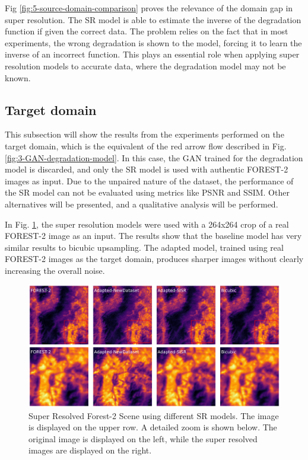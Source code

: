         Fig \ref{fig:5-source-domain-comparison} proves the relevance of the domain gap in super resolution. The SR model is able to estimate the inverse of the degradation function if given the correct data. The problem relies on the fact that in most experiments, the wrong degradation is shown to the model, forcing it to learn the inverse of an incorrect function.  
        This plays an essential role when applying super resolution models to accurate data, where the degradation model may not be known. 

    \subsection{Target domain}

        This subsection will show the results from the experiments performed on the target domain, which is the equivalent of the red arrow flow described in Fig. \ref{fig:3-GAN-degradation-model}.
        In this case, the GAN trained for the degradation model is discarded, and only the SR model is used with authentic FOREST-2 images as input.
        Due to the unpaired nature of the dataset, the performance of the SR model can not be evaluated using metrics like PSNR and SSIM. 
        Other alternatives will be presented, and a qualitative analysis will be performed. 
        
        In Fig. \ref{fig:5-target_prediction_sample}, the super resolution models were used with a 264x264 crop of a real FOREST-2 image as an input.
        The results show that the baseline model has very similar results to bicubic upsampling.
        The adapted model, trained using real FOREST-2 images as the target domain, produces sharper images without clearly increasing the overall noise.
        
        


        \begin{figure}[H]
            \centering
            \includegraphics[scale=0.28]{Includes/5-target_prediction_sample.pdf}
            \caption{Super Resolved Forest-2 Scene using different SR models.
                     The image is displayed on the upper row. A detailed zoom is shown below. The original image is displayed on the left, while the super resolved images are displayed on the right.
                    }
            \label{fig:5-target_prediction_sample}
        \end{figure}

